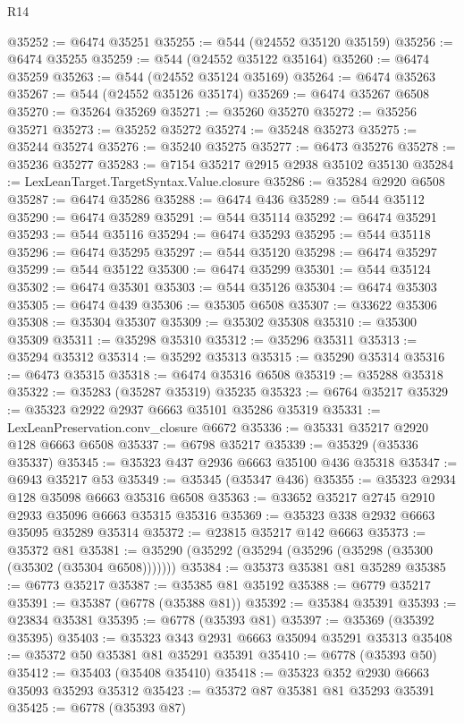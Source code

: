 \begin{lexlean}{R14}
\begin{coremodule}
@35252 := @6474 @35251
@35255 := @544 (@24552 @35120 @35159)
@35256 := @6474 @35255
@35259 := @544 (@24552 @35122 @35164)
@35260 := @6474 @35259
@35263 := @544 (@24552 @35124 @35169)
@35264 := @6474 @35263
@35267 := @544 (@24552 @35126 @35174)
@35269 := @6474 @35267 @6508
@35270 := @35264 @35269
@35271 := @35260 @35270
@35272 := @35256 @35271
@35273 := @35252 @35272
@35274 := @35248 @35273
@35275 := @35244 @35274
@35276 := @35240 @35275
@35277 := @6473 @35276
@35278 := @35236 @35277
@35283 := @7154 @35217 @2915 @2938 @35102 @35130
@35284 := LexLeanTarget.TargetSyntax.Value.closure
@35286 := @35284 @2920 @6508
@35287 := @6474 @35286
@35288 := @6474 @436
@35289 := @544 @35112
@35290 := @6474 @35289
@35291 := @544 @35114
@35292 := @6474 @35291
@35293 := @544 @35116
@35294 := @6474 @35293
@35295 := @544 @35118
@35296 := @6474 @35295
@35297 := @544 @35120
@35298 := @6474 @35297
@35299 := @544 @35122
@35300 := @6474 @35299
@35301 := @544 @35124
@35302 := @6474 @35301
@35303 := @544 @35126
@35304 := @6474 @35303
@35305 := @6474 @439
@35306 := @35305 @6508
@35307 := @33622 @35306
@35308 := @35304 @35307
@35309 := @35302 @35308
@35310 := @35300 @35309
@35311 := @35298 @35310
@35312 := @35296 @35311
@35313 := @35294 @35312
@35314 := @35292 @35313
@35315 := @35290 @35314
@35316 := @6473 @35315
@35318 := @6474 @35316 @6508
@35319 := @35288 @35318
@35322 := @35283 (@35287 @35319) @35235
@35323 := @6764 @35217
@35329 := @35323 @2922 @2937 @6663 @35101 @35286 @35319
@35331 := LexLeanPreservation.conv_closure @6672
@35336 := @35331 @35217 @2920 @128 @6663 @6508
@35337 := @6798 @35217
@35339 := @35329 (@35336 @35337)
@35345 := @35323 @437 @2936 @6663 @35100 @436 @35318
@35347 := @6943 @35217 @53
@35349 := @35345 (@35347 @436)
@35355 := @35323 @2934 @128 @35098 @6663 @35316 @6508
@35363 := @33652 @35217 @2745 @2910 @2933 @35096 @6663 @35315 @35316
@35369 := @35323 @338 @2932 @6663 @35095 @35289 @35314
@35372 := @23815 @35217 @142 @6663
@35373 := @35372 @81
@35381 := @35290 (@35292 (@35294 (@35296 (@35298 (@35300 (@35302 (@35304 @6508)))))))
@35384 := @35373 @35381 @81 @35289
@35385 := @6773 @35217
@35387 := @35385 @81 @35192
@35388 := @6779 @35217
@35391 := @35387 (@6778 (@35388 @81))
@35392 := @35384 @35391
@35393 := @23834 @35381
@35395 := @6778 (@35393 @81)
@35397 := @35369 (@35392 @35395)
@35403 := @35323 @343 @2931 @6663 @35094 @35291 @35313
@35408 := @35372 @50 @35381 @81 @35291 @35391
@35410 := @6778 (@35393 @50)
@35412 := @35403 (@35408 @35410)
@35418 := @35323 @352 @2930 @6663 @35093 @35293 @35312
@35423 := @35372 @87 @35381 @81 @35293 @35391
@35425 := @6778 (@35393 @87)

\end{coremodule}
\end{lexlean}
